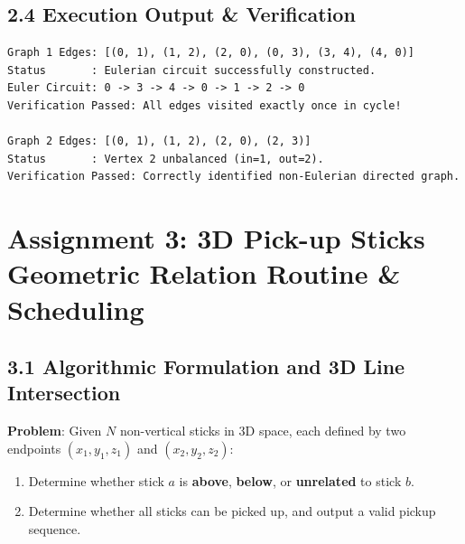 \documentclass[12pt]{article}
\begin{document}
\subsection*{2.4 Execution Output \& Verification}
\begin{lstlisting}
Graph 1 Edges: [(0, 1), (1, 2), (2, 0), (0, 3), (3, 4), (4, 0)]
Status       : Eulerian circuit successfully constructed.
Euler Circuit: 0 -> 3 -> 4 -> 0 -> 1 -> 2 -> 0
Verification Passed: All edges visited exactly once in cycle!

Graph 2 Edges: [(0, 1), (1, 2), (2, 0), (2, 3)]
Status       : Vertex 2 unbalanced (in=1, out=2).
Verification Passed: Correctly identified non-Eulerian directed graph.
\end{lstlisting}

\newpage

\section*{Assignment 3: 3D Pick-up Sticks Geometric Relation Routine \& Scheduling}

\subsection*{3.1 Algorithmic Formulation and 3D Line Intersection}
\textbf{Problem}: Given $N$ non-vertical sticks in 3D space, each defined by two endpoints $(x_1, y_1, z_1)$ and $(x_2, y_2, z_2)$:
\begin{enumerate}
    \item[(a)] Determine whether stick $a$ is \textbf{above}, \textbf{below}, or \textbf{unrelated} to stick $b$.
    \item[(b)] Determine whether all sticks can be picked up, and output a valid pickup sequence.
\end{enumerate}
\end{document}
